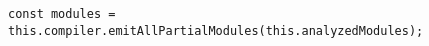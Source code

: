 \begin{verbatim}
const modules = this.compiler.emitAllPartialModules(this.analyzedModules);
\end{verbatim}
